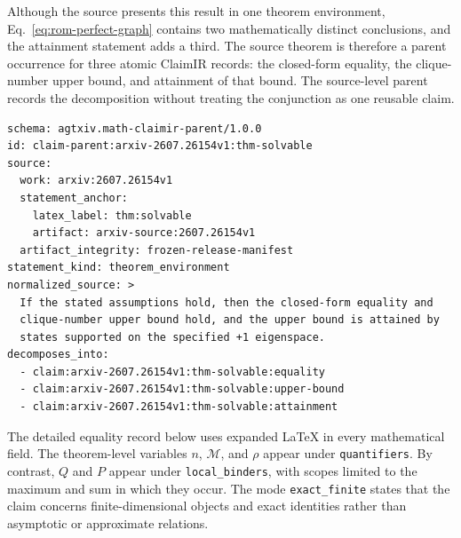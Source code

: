 Although the source presents this result in one theorem environment, Eq.~\ref{eq:rom-perfect-graph} contains two mathematically distinct conclusions, and the attainment statement adds a third. The source theorem is therefore a parent occurrence for three atomic ClaimIR records: the closed-form equality, the clique-number upper bound, and attainment of that bound. The source-level parent records the decomposition without treating the conjunction as one reusable claim.

\begin{verbatim}
schema: agtxiv.math-claimir-parent/1.0.0
id: claim-parent:arxiv-2607.26154v1:thm-solvable
source:
  work: arxiv:2607.26154v1
  statement_anchor:
    latex_label: thm:solvable
    artifact: arxiv-source:2607.26154v1
  artifact_integrity: frozen-release-manifest
statement_kind: theorem_environment
normalized_source: >
  If the stated assumptions hold, then the closed-form equality and
  clique-number upper bound hold, and the upper bound is attained by
  states supported on the specified +1 eigenspace.
decomposes_into:
  - claim:arxiv-2607.26154v1:thm-solvable:equality
  - claim:arxiv-2607.26154v1:thm-solvable:upper-bound
  - claim:arxiv-2607.26154v1:thm-solvable:attainment
\end{verbatim}

The detailed equality record below uses expanded \LaTeX{} in every mathematical field. The theorem-level variables $n$, $\mathcal{M}$, and $\rho$ appear under \texttt{quantifiers}. By contrast, $Q$ and $P$ appear under \texttt{local\_binders}, with scopes limited to the maximum and sum in which they occur. The mode \texttt{exact\_finite} states that the claim concerns finite-dimensional objects and exact identities rather than asymptotic or approximate relations.

